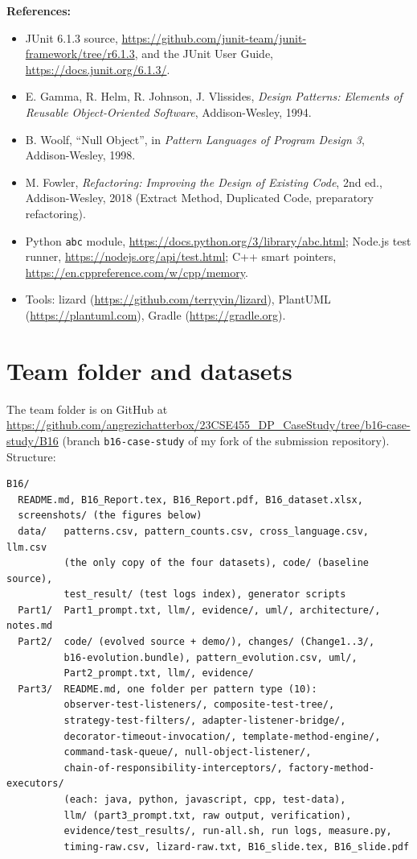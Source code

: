 \documentclass[11pt,a4paper]{article}
\newcommand{\entry}[1]{\textbf{#1:} }
\begin{document}
\entry{References}
\begin{itemize}
\item JUnit 6.1.3 source, \url{https://github.com/junit-team/junit-framework/tree/r6.1.3}, and the JUnit User Guide, \url{https://docs.junit.org/6.1.3/}.
\item E. Gamma, R. Helm, R. Johnson, J. Vlissides, \emph{Design Patterns: Elements of Reusable Object-Oriented Software}, Addison-Wesley, 1994.
\item B. Woolf, ``Null Object'', in \emph{Pattern Languages of Program Design 3}, Addison-Wesley, 1998.
\item M. Fowler, \emph{Refactoring: Improving the Design of Existing Code}, 2nd ed., Addison-Wesley, 2018 (Extract Method, Duplicated Code, preparatory refactoring).
\item Python \texttt{abc} module, \url{https://docs.python.org/3/library/abc.html}; Node.js test runner, \url{https://nodejs.org/api/test.html}; C++ smart pointers, \url{https://en.cppreference.com/w/cpp/memory}.
\item Tools: lizard (\url{https://github.com/terryyin/lizard}), PlantUML (\url{https://plantuml.com}), Gradle (\url{https://gradle.org}).
\end{itemize}

\section{Team folder and datasets}
The team folder is on GitHub at \url{https://github.com/angrezichatterbox/23CSE455_DP_CaseStudy/tree/b16-case-study/B16} (branch \texttt{b16-case-study} of my fork of the submission repository). Structure:
\begin{verbatim}
B16/
  README.md, B16_Report.tex, B16_Report.pdf, B16_dataset.xlsx,
  screenshots/ (the figures below)
  data/   patterns.csv, pattern_counts.csv, cross_language.csv, llm.csv
          (the only copy of the four datasets), code/ (baseline source),
          test_result/ (test logs index), generator scripts
  Part1/  Part1_prompt.txt, llm/, evidence/, uml/, architecture/, notes.md
  Part2/  code/ (evolved source + demo/), changes/ (Change1..3/,
          b16-evolution.bundle), pattern_evolution.csv, uml/,
          Part2_prompt.txt, llm/, evidence/
  Part3/  README.md, one folder per pattern type (10):
          observer-test-listeners/, composite-test-tree/,
          strategy-test-filters/, adapter-listener-bridge/,
          decorator-timeout-invocation/, template-method-engine/,
          command-task-queue/, null-object-listener/,
          chain-of-responsibility-interceptors/, factory-method-executors/
          (each: java, python, javascript, cpp, test-data),
          llm/ (part3_prompt.txt, raw output, verification),
          evidence/test_results/, run-all.sh, run logs, measure.py,
          timing-raw.csv, lizard-raw.txt, B16_slide.tex, B16_slide.pdf
\end{verbatim}
\end{document}
